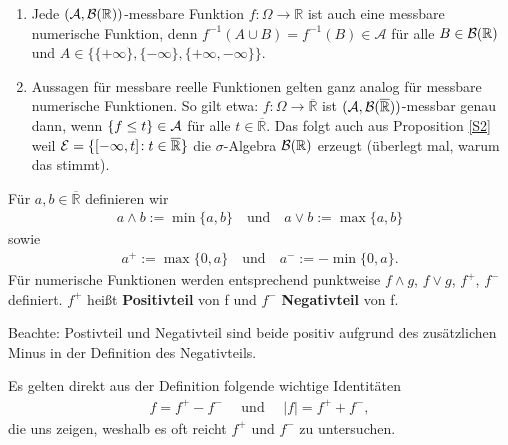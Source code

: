 \begin{bem}
\abs
	\begin{enumerate}[label=(\roman*)]
		\item Jede $(\mathcal A, \mathcal B(\mathbb{R}))$-messbare Funktion $f \! : \Omega \rightarrow \mathbb{R}$ ist auch eine messbare numerische Funktion, denn $f^{-1} (A \cup B) = f^{-1}(B) \in \mathcal{A} $ für alle  $B\in \mathcal B(\mathbb{R})$ und $A \in \{ \{+\infty\}, \{-\infty\}, \{+\infty,-\infty\} \}$.
		\item Aussagen für messbare reelle Funktionen gelten ganz analog für messbare numerische Funktionen. So gilt etwa: $f \! : \Omega \rightarrow \overline{\mathbb{R}}$ ist $(\mathcal{A}, \mathcal{B}(\mathbb{\overline R}))$-messbar genau dann, wenn $\{ f \leq t \} \in \mathcal{A}$ f\"ur alle $t \in \overline{\mathbb{R}}$. Das folgt auch aus Proposition \ref{S2} weil $\mathcal{E} = \{ [-\infty,t] \! : t \in \overline{\mathbb{R}} \}$ die $\sigma$-Algebra $\mathcal{B}(\mathbb{R})$ erzeugt (\"uberlegt mal, warum das stimmt).
	\end{enumerate}
\end{bem}

\begin{deff}
	Für $a,b \in \overline{\mathbb{R}}$ definieren wir
	\begin{align*}
		a \land b := \min\{ a,b \} \quad \text{und}\quad
		a \lor b := \max\{ a,b \}
	\end{align*}
	sowie
	\begin{align*}
		a^{+} := \max\{ 0, a \} \quad\text{und}\quad
		a^{-} := -\min\{ 0, a \}.
	\end{align*}
	F\"ur numerische Funktionen werden entsprechend punktweise  $f \land g$, $f \lor g$, $f^{+}$, $f^{-}$ definiert. $f^{+}$ heißt \textbf{Positivteil} von f und $f^{-}$ \textbf{Negativteil} von f.
\end{deff}
Beachte: Postivteil und Negativteil sind beide positiv aufgrund des zus\"atzlichen Minus in der Definition des Negativteils.\smallskip

Es gelten direkt aus der Definition folgende wichtige Identit\"aten
\begin{align*}
	f = f^{+} - f^{-}\quad \text{ und }\quad |f| = f^{+} + f^{-},
\end{align*}
die uns zeigen, weshalb es oft reicht $f^+$ und $f^-$ zu untersuchen.



